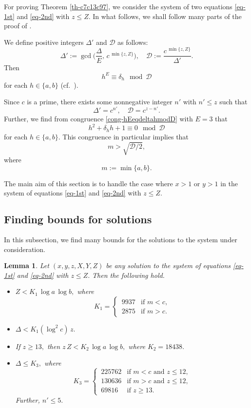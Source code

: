 \documentclass[11pt]{amsart}
\newtheorem{lem}{Lemma}[section]
\numberwithin{equation}{section}
\begin{document}
For proving Theorem \ref{th-c7c13c97}, we consider the system of two equations \eqref{eq-1st} and \eqref{eq-2nd} with $z \le Z$. 
In what follows, we shall follow many parts of the proof of \cite[Theorem 3]{MP3}. 

We define positive integers $\Delta'$ and $\mathcal D$ as follows: 
\[
\Delta':=\gcd \biggr( \frac{\Delta}{E},\,c^{\,\min\{z,Z\}}\bigg), \quad \mathcal D:=\frac{c^{\,\min\{z,Z\}}}{\Delta'}.
\]
Then
\begin{equation} \label{cong-hEeqdeltahmodD}
h^E \equiv \delta_h \mod{\mathcal D}
\end{equation}
for each $h \in \{a,b\}$ (cf.~\cite[Lemma 4.4\,(iii)]{MP3}).

Since $c$ is a prime, there exists some nonnegative integer $n'$ with $n' \le z$ such that
\[
\Delta'=c^{n'}, \quad \mathcal D=c^{z-n'}.
\]
Further, we find from congruence \eqref{cong-hEeqdeltahmodD} with $E=3$ that
\begin{equation} \label{c13-divrel}
h^2 + \delta_h h + 1 \equiv 0 \mod{\mathcal D}
\end{equation}
for each $h \in \{a,b\}$. 
This congruence in particular implies that 
\[
m > \sqrt{\mathcal D /2},
\]
where 
\[
m:=\min\{a,b\}.
\]

The main aim of this section is to handle the case where $x>1$ or $y>1$ in the system of equations \eqref{eq-1st} and \eqref{eq-2nd} with $z \le Z$.

\subsection{Finding bounds for solutions}
%
In this subsection, we find many bounds for the solutions to the system under consideration.

\begin{lem} \label{lem-c7-i-iv}
Let $(x,y,z,X,Y,Z)$ be any solution to the system of equations \eqref{eq-1st} and \eqref{eq-2nd} with $z \le Z.$
Then the following hold.
\begin{itemize}
\item[(i)] 
$Z<K_1\,\log a\,\log b,$ where
\[ K_1=\begin{cases}
\,9937 & \text{if $m<c,$} \\
\,2875 & \text{if $m>c$}.
\end{cases} \]
\item[(ii)] $\Delta<K_1(\log^2 c)\,z.$
\item[(iii)] If $z \ge 13,$ then $z\,Z<K_2\,\log a\,\log b,$ where $K_2=18438.$
\item[(iv)] $\Delta \le K_3,$ where
\[ K_3=\begin{cases}
\,225762 & \text{if $m<c$ and $z \le 12,$} \\
\,130636 & \text{if $m>c$ and $z \le 12,$} \\
\,69816 & \text{if $z \ge 13.$}
\end{cases} \]
Further, $n' \le 5.$
\end{itemize}
\end{lem}
\end{document}
